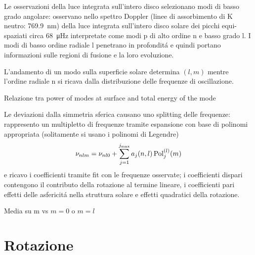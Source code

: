 \documentclass[../main.tex]{subfiles}
\begin{document}
\begin{workout}
Le osservazioni della luce integrata sull'intero disco selezionano modi di basso grado angolare: \citet{cla79solar} osservano nello spettro Doppler (linee di assorbimento di K neutro: \SI{769.9}{\nano\meter}) della luce integrata sull'intero disco solare dei picchi equi-spaziati circa \SI{68}{\micro\hertz} interpretate come modi p di alto ordine n e basso grado l. I modi di basso ordine radiale l penetrano in profondit\'a e quindi portano informazioni sulle regioni di fusione e la loro evoluzione.
\end{workout}

\begin{workout}
L'andamento di un modo sulla superficie solare determina $(l,m)$ mentre l'ordine radiale n si ricava dalla distribuzione delle frequenze di oscillazione.
\end{workout}

\begin{workout}
Relazione tra power of modes at surface and total energy of the mode
\end{workout}


\begin{workout}
Le deviazioni dalla simmetria sferica causano uno splitting delle frequenze: rappresento un multipletto di frequenze tramite espansione con base di polinomi appropriata (solitamente si usano i polinomi di Legendre)
\begin{equation}
\nu_{nlm}=\nu_{nl0}+\sum_{j=1}^{j_{\max}}a_j(n,l)\operatorname{Pol}_j^{(l)}(m)\label{eq:freqmulti}
\end{equation}
e ricavo i coefficienti tramite fit con le frequenze osservate; i coefficienti dispari contengono il contributo della rotazione al termine lineare, i coefficienti pari effetti delle asfericit\'a nella struttura solare e effetti quadratici della rotazione.

Media su m vs $m=0$ o $m=l$
\end{workout}

\section{Rotazione}
\end{document}

